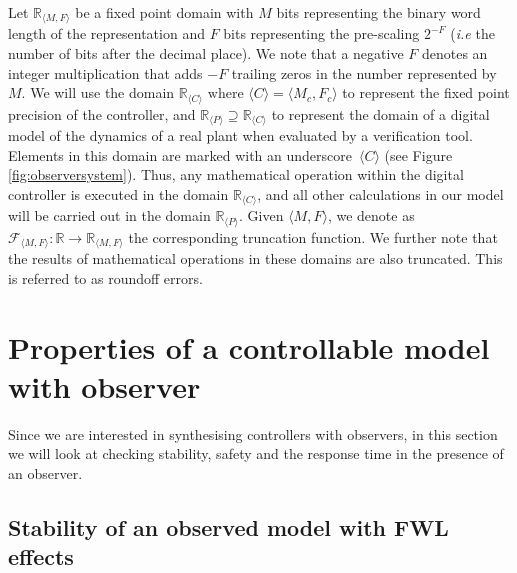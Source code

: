 \documentclass[sigconf]{llncs}
\begin{document}
Let $\mathbb{R}_{\langle M,F \rangle}$ be a fixed point domain with $M$ bits
representing the binary word length of the representation and $F$ bits
representing the pre-scaling $2^{-F}$ (\emph{i.e} the number of bits after
the decimal place).  We note that a negative $F$ denotes an integer
multiplication that adds $-F$ trailing zeros in the number represented by
$M$. 
We will use the domain $\mathbb{R}_{\langle C \rangle} \text{ where } \langle C \rangle = \langle M_c,F_c \rangle$
to represent the fixed point precision of the controller, and 
$\mathbb{R}_{\langle P \rangle} \supseteq \mathbb{R}_{\langle C \rangle}$
to represent the domain of a digital model of the dynamics of a real plant when
evaluated by a verification tool.  Elements in this domain are marked with an
underscore~${\langle C \rangle}$ (see Figure \ref{fig:observersystem}).
Thus, any mathematical operation within the digital controller is executed in the
domain $\mathbb{R}_{\langle C \rangle}$, and all other calculations
in our model will be carried out in the domain $\mathbb{R}_{\langle P \rangle}$.
Given ${\langle M,F \rangle}$, 
we denote as $\mathcal{F}_{\langle M,F \rangle} : \mathbb{R} \rightarrow \mathbb{R}_{\langle M,F \rangle}$ the corresponding truncation function. 
We further note that the results of mathematical operations in these domains are also truncated. This is referred to as roundoff errors.

\section{Properties of a controllable model with observer}\label{sec:cof_verification}

Since we are interested in synthesising controllers with observers, 
in this section we will look at checking stability, safety and the response time in the presence of an observer.

\subsection{Stability of an observed model with FWL effects}\label{sec:cof_fwl_stability}
\end{document}
